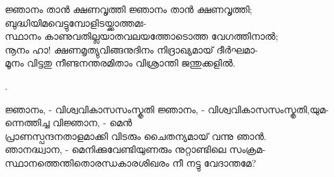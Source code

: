 \begin{enumerate}

\begin{slokam}{\VSv}{\KA}{ജ്ഞാനം താൻ ക്ഷണവൃത്തി}
ജ്ഞാനം താൻ ക്ഷണവൃത്തി; ബുദ്ധിയിമവെട്ടുമ്പോളിടയ്ക്കാത്തമഃ-\\
സ്ഥാനം കാണുവതില്ലയാതവലയത്തോടൊത്ത വേഗത്തിനാൽ;\\
നൂനം ഹാ! ക്ഷണമൃത്യുവിങ്ങനുദിനം നിദ്രാഖ്യമായ് ദീർഘമാ-\\
മൂനം വിട്ടതു നീണ്ടനന്തരമിതാം വിശ്രാന്തി ജന്തുക്കളിൽ.
\end{slokam}


.


\begin{slokam}{\VSv}{\VRV}{ജ്ഞാനം, - വിശ്വവികാസസംസ്കൃതി}
ജ്ഞാനം, - വിശ്വവികാസസംസ്കൃതി,യുമ- ന്നെത്തിച്ച വിജ്ഞാന, - മെന്‍ \\ 
പ്രാണസ്പന്ദനതാളമാക്കി വിടരും ചൈതന്യമായ്‌ വന്നു ഞാന്‍. \\
ഞാനദ്ധ്വാന, - മെനിക്കുവേണ്ടിയുണരും നുറ്റാണ്ടിലെ സംക്രമ-\\
സ്ഥാനത്തെന്തിതൊരന്ധകാരശിഖരം നീ നട്ടു വേദാന്തമേ? 
\end{slokam}



\end{enumerate}

